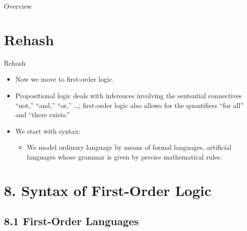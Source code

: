 \setcounter{framenumber}{224}
\begin{frame}
  \maketitle
\end{frame}

\begin{frame}{Overview}
\tableofcontents
\end{frame}

\section{Rehash}
\begin{frame}{Rehash}
	
\begin{itemize}

	\item Now we move to first-order logic.
	
	\item Propositional logic deals with inferences involving the sentential connectives ``not,'' ``and,'' ``or,'' \dots; \alert{first-order logic also allows for the quantifiers ``for all'' and ``there exists.''}

	\item We start with syntax:
	
		\begin{itemize}
		
			\item \alert{We model ordinary language by means of formal languages, artificial languages whose grammar is given by precise mathematical rules.}

		
		\end{itemize}
	
\end{itemize}

\end{frame}
		

\section{8. Syntax of First-Order Logic}
\subsection{8.1 First-Order Languages}

